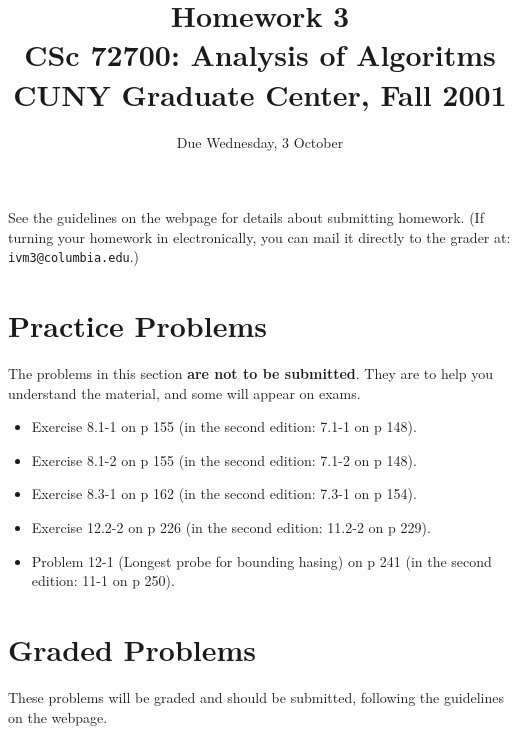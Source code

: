\documentclass[11pt]{article}
\begin{document}
\title{Homework 3\\
       CSc 72700: Analysis of Algoritms\\
       CUNY Graduate Center, Fall 2001 }
\date{Due Wednesday, 3 October}
\author{}
\maketitle

See the guidelines on the webpage for details about submitting homework.
(If turning your homework in electronically, you can mail it directly
to the grader at: {\tt ivm3@columbia.edu}.)

\section*{Practice Problems}

The problems in this section {\bf are not to be submitted}.  They are to
help you understand the material, and some will appear on exams.  

\begin{itemize}
    \item Exercise 8.1-1 on p 155 (in the second edition: 7.1-1 on p 148).
    \item Exercise 8.1-2 on p 155 (in the second edition: 7.1-2 on p 148).
    \item Exercise 8.3-1 on p 162 (in the second edition: 7.3-1 on p 154).
    \item Exercise 12.2-2 on p 226 (in the second edition: 11.2-2 on p 229).
    \item Problem 12-1 (Longest probe for bounding hasing) on p 241 
	(in the second edition: 11-1 on p 250).
    
\end{itemize}

\section*{Graded Problems}

These problems will be graded and should be submitted, following the
guidelines on the webpage.
\end{document}
